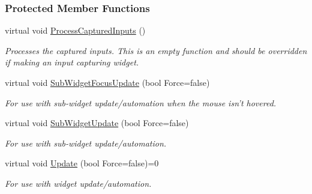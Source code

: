 \subsubsection*{Protected Member Functions}
\begin{DoxyCompactItemize}
\item 
\hypertarget{classphys_1_1UI_1_1Widget_ac51b863fb1a9c5ebaef1386b77dbda99}{
virtual void \hyperlink{classphys_1_1UI_1_1Widget_ac51b863fb1a9c5ebaef1386b77dbda99}{ProcessCapturedInputs} ()}
\label{classphys_1_1UI_1_1Widget_ac51b863fb1a9c5ebaef1386b77dbda99}

\begin{DoxyCompactList}\small\item\em Processes the captured inputs. This is an empty function and should be overridden if making an input capturing widget. \item\end{DoxyCompactList}\item 
\hypertarget{classphys_1_1UI_1_1Widget_a4a7e18c48a7cd230fd4a0aa274c6a654}{
virtual void \hyperlink{classphys_1_1UI_1_1Widget_a4a7e18c48a7cd230fd4a0aa274c6a654}{SubWidgetFocusUpdate} (bool Force=false)}
\label{classphys_1_1UI_1_1Widget_a4a7e18c48a7cd230fd4a0aa274c6a654}

\begin{DoxyCompactList}\small\item\em For use with sub-\/widget update/automation when the mouse isn't hovered. \item\end{DoxyCompactList}\item 
\hypertarget{classphys_1_1UI_1_1Widget_a3472e5d0f8281e704d67d419980cd918}{
virtual void \hyperlink{classphys_1_1UI_1_1Widget_a3472e5d0f8281e704d67d419980cd918}{SubWidgetUpdate} (bool Force=false)}
\label{classphys_1_1UI_1_1Widget_a3472e5d0f8281e704d67d419980cd918}

\begin{DoxyCompactList}\small\item\em For use with sub-\/widget update/automation. \item\end{DoxyCompactList}\item 
\hypertarget{classphys_1_1UI_1_1Widget_a1806425fcd684c2f0d50cd0ef4a6b0da}{
virtual void \hyperlink{classphys_1_1UI_1_1Widget_a1806425fcd684c2f0d50cd0ef4a6b0da}{Update} (bool Force=false)=0}
\label{classphys_1_1UI_1_1Widget_a1806425fcd684c2f0d50cd0ef4a6b0da}

\begin{DoxyCompactList}\small\item\em For use with widget update/automation. \item\end{DoxyCompactList}\end{DoxyCompactItemize}
